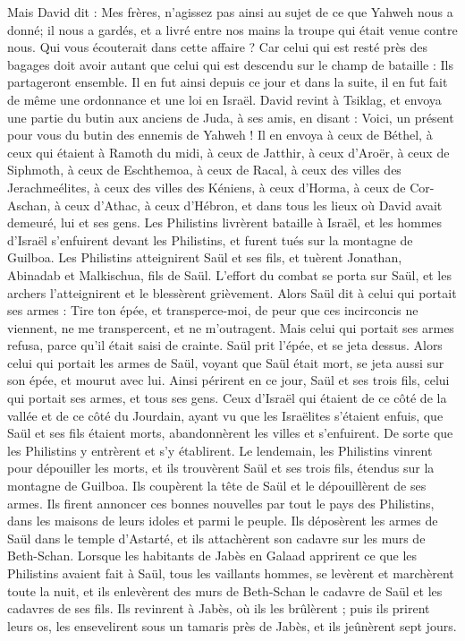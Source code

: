 \begin{multicols}{2}
Mais David dit : Mes frères, n’agissez pas ainsi au sujet de ce que Yahweh nous a donné; il nous a gardés, et a livré entre nos mains la troupe qui était venue contre nous.
Qui vous écouterait dans cette affaire ? Car celui qui est resté près des bagages doit avoir autant que celui qui est descendu sur le champ de bataille : Ils partageront ensemble.
Il en fut ainsi depuis ce jour et dans la suite, il en fut fait de même une ordonnance et une loi en Israël.
David revint à Tsiklag, et envoya une partie du butin aux anciens de Juda, à ses amis, en disant : Voici, un présent pour vous du butin des ennemis de Yahweh !
Il en envoya à ceux de Béthel, à ceux qui étaient à Ramoth du midi, à ceux de Jatthir,
à ceux d’Aroër, à ceux de Siphmoth, à ceux de Eschthemoa,
à ceux de Racal, à ceux des villes des Jerachmeélites, à ceux des villes des Kéniens,
à ceux d’Horma, à ceux de Cor-Aschan, à ceux d’Athac,
à ceux d’Hébron, et dans tous les lieux où David avait demeuré, lui et ses gens.
\VerseOne{}Les Philistins livrèrent bataille à Israël, et les hommes d'Israël s'enfuirent devant les Philistins, et furent tués sur la montagne de Guilboa.
Les Philistins atteignirent Saül et ses fils, et tuèrent Jonathan, Abinadab et Malkischua, fils de Saül.
L’effort du combat se porta sur Saül, et les archers l’atteignirent et le blessèrent grièvement.
Alors Saül dit à celui qui portait ses armes : Tire ton épée, et transperce-moi, de peur que ces incirconcis ne viennent, ne me transpercent, et ne m’outragent. Mais celui qui portait ses armes refusa, parce qu'il était saisi de crainte. Saül prit l'épée, et se jeta dessus.
Alors celui qui portait les armes de Saül, voyant que Saül était mort, se jeta aussi sur son épée, et mourut avec lui.
Ainsi périrent en ce jour, Saül et ses trois fils, celui qui portait ses armes, et tous ses gens.
Ceux d'Israël qui étaient de ce côté de la vallée et de ce côté du Jourdain, ayant vu que les Israëlites s'étaient enfuis, que Saül et ses fils étaient morts, abandonnèrent les villes et s'enfuirent. De sorte que les Philistins y entrèrent et s’y établirent.
Le lendemain, les Philistins vinrent pour dépouiller les morts, et ils trouvèrent Saül et ses trois fils, étendus sur la montagne de Guilboa.
Ils coupèrent la tête de Saül et le dépouillèrent de ses armes. Ils firent annoncer ces bonnes nouvelles par tout le pays des Philistins, dans les maisons de leurs idoles et parmi le peuple.
Ils déposèrent les armes de Saül dans le temple d’Astarté, et ils attachèrent son cadavre sur les murs de Beth-Schan.
Lorsque les habitants de Jabès en Galaad apprirent ce que les Philistins avaient fait à Saül,
tous les vaillants hommes, se levèrent et marchèrent toute la nuit, et ils enlevèrent des murs de Beth-Schan le cadavre de Saül et les cadavres de ses fils. Ils revinrent à Jabès, où ils les brûlèrent ;
puis ils prirent leurs os, les ensevelirent sous un tamaris près de Jabès, et ils jeûnèrent sept jours.
\PPE{}
\end{multicols}
